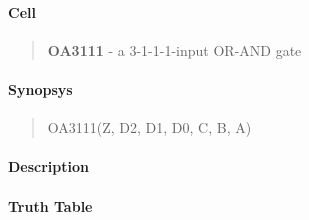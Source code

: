 \label{OA3111}
\paragraph{Cell}
\begin{quote}
    \textbf{OA3111} - a 3-1-1-1-input OR-AND gate
\end{quote}

\paragraph{Synopsys}
\begin{quote}
    OA3111(Z, D2, D1, D0, C, B, A)
\end{quote}

\paragraph{Description}

%

\paragraph{Truth Table}


